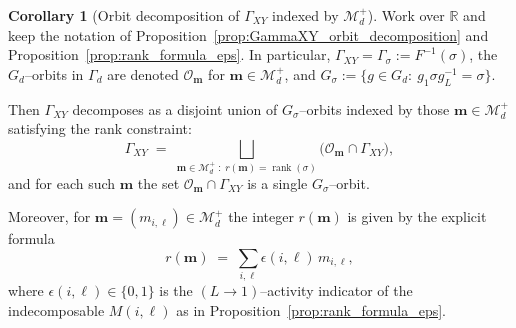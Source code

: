 \documentclass{article}
\newcommand{\rank}{\operatorname{rank}}
\theoremstyle{definition}
\newtheorem{corollary}[theorem]{Corollary}
\begin{document}
\begin{corollary}[Orbit decomposition of $\Gamma_{XY}$ indexed by $\mathcal M_d^+$]
\label{cor:GammaXY_decomposition_by_Mdplus}
Work over $\mathbb{R}$ and keep the notation of Proposition~\ref{prop:GammaXY_orbit_decomposition}
and Proposition~\ref{prop:rank_formula_eps}. In particular, $\Gamma_{XY}=\Gamma_\sigma:=F^{-1}(\sigma)$,
the $G_d$--orbits in $\Gamma_d$ are denoted $\mathcal O_{\mathbf m}$ for $\mathbf m\in\mathcal M_d^+$,
and $G_\sigma:=\{g\in G_d:\ g_1\sigma g_L^{-1}=\sigma\}$.

Then $\Gamma_{XY}$ decomposes as a disjoint union of $G_\sigma$--orbits indexed by those
$\mathbf m\in\mathcal M_d^+$ satisfying the rank constraint:
\[
\Gamma_{XY}
\;=\;
\bigsqcup_{\mathbf m\in\mathcal M_d^+\;:\; r(\mathbf m)=\rank(\sigma)}
\big(\mathcal O_{\mathbf m}\cap \Gamma_{XY}\big),
\]
and for each such $\mathbf m$ the set $\mathcal O_{\mathbf m}\cap \Gamma_{XY}$ is a single $G_\sigma$--orbit.

Moreover, for $\mathbf m=(m_{i,\ell})\in\mathcal M_d^+$ the integer $r(\mathbf m)$ is given by the explicit formula
\[
r(\mathbf m)\;=\;\sum_{i,\ell}\epsilon(i,\ell)\,m_{i,\ell},
\]
where $\epsilon(i,\ell)\in\{0,1\}$ is the $(L\to 1)$--activity indicator of the indecomposable $M(i,\ell)$
as in Proposition~\ref{prop:rank_formula_eps}.
\end{corollary}
\end{document}
